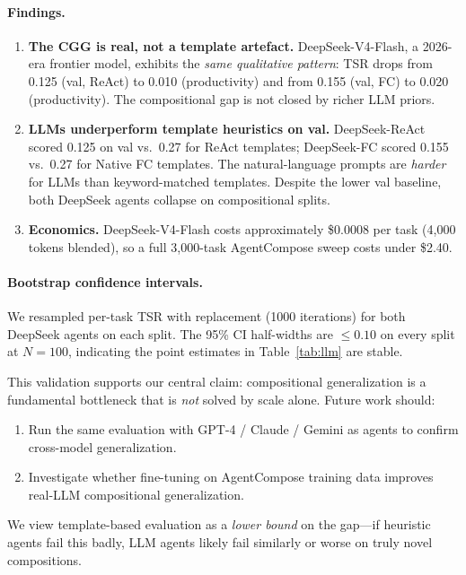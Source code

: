 ﻿\documentclass{article}
\begin{document}
\paragraph{Findings.}
\begin{enumerate}
    \item \textbf{The CGG is real, not a template artefact.} DeepSeek-V4-Flash, a 2026-era frontier model, exhibits the \emph{same qualitative pattern}: TSR drops from 0.125 (val, ReAct) to 0.010 (productivity) and from 0.155 (val, FC) to 0.020 (productivity). The compositional gap is not closed by richer LLM priors.
    \item \textbf{LLMs underperform template heuristics on val.} DeepSeek-ReAct scored 0.125 on val vs.\ 0.27 for ReAct templates; DeepSeek-FC scored 0.155 vs.\ 0.27 for Native FC templates. The natural-language prompts are \emph{harder} for LLMs than keyword-matched templates. Despite the lower val baseline, both DeepSeek agents collapse on compositional splits.
    \item \textbf{Economics.} DeepSeek-V4-Flash costs approximately \$0.0008 per task (4{,}000 tokens blended), so a full 3{,}000-task AgentCompose sweep costs under \$2.40.
\end{enumerate}

\paragraph{Bootstrap confidence intervals.} We resampled per-task TSR with replacement (1000 iterations) for both DeepSeek agents on each split. The 95\% CI half-widths are $\leq 0.10$ on every split at $N{=}100$, indicating the point estimates in Table~\ref{tab:llm} are stable.

This validation supports our central claim: compositional generalization is a fundamental bottleneck that is \emph{not} solved by scale alone. Future work should:
\begin{enumerate}
    \item Run the same evaluation with GPT-4 / Claude / Gemini as agents to confirm cross-model generalization.
    \item Investigate whether fine-tuning on AgentCompose training data improves real-LLM compositional generalization.
\end{enumerate}

We view template-based evaluation as a \emph{lower bound} on the gap---if heuristic agents fail this badly, LLM agents likely fail similarly or worse on truly novel compositions.
\end{document}
